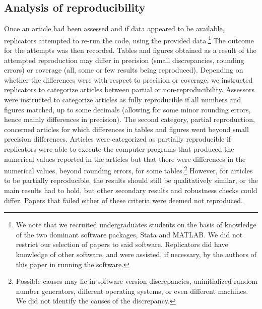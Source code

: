 


\subsection{Analysis of reproducibility}



Once an article had been assessed and if data appeared to be available, replicators attempted to re-run the code, using the provided data.\footnote{We note that we recruited undergraduates students on the basis of knowledge of the two dominant software packages, Stata and MATLAB. We did not restrict our selection of papers to said software. Replicators did have knowledge of other software, and were assisted, if necessary, by the authors of this paper in running the software. } The outcome for the  attempts was then recorded. 
%
Tables and figures obtained as a result of the attempted reproduction may differ in precision (small discrepancies, rounding errors) or coverage (all, some or few results being reproduced). Depending on whether the differences were with respect to precision or coverage, we instructed replicators to categorize articles between partial or non-reproducibility. Assessors were instructed to categorize articles as fully reproducible if all numbers and figures matched, up to some decimals (allowing for some minor rounding errors, hence mainly differences in precision). The second category, partial reproduction, concerned articles for which differences in tables and figures went beyond small precision differences. Articles were categorized as partially reproducible if replicators were able to execute the computer programs that produced the numerical values reported in the articles but that there were differences in the numerical values, beyond rounding errors, for some tables.\footnote{Possible causes may lie in software version discrepancies, uninitialized random number generators, different operating systems, or even different machines. We did not identify the causes of the discrepancy.} However, for articles to be partially reproducible, the results should still be qualitatively similar, or the main results had to hold, but other secondary results and robustness checks could differ. Papers that failed either of these criteria were deemed not reproduced.


